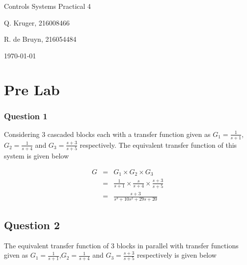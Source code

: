 \documentclass[12pt, a4paper]{article}
\begin{document}
		\begin{titlepage}
			\centering
			{\LARGE Controls Systems Practical 4 \par}
			\vspace*{1.5cm}
			{\large Q. Kruger, 216008466 \par}
			{\large R. de Bruyn, 216054484 \par}
			\vspace*{1.2cm}
			{\large \today}
			\vspace*{\fill}
			\vspace*{\fill}
		\end{titlepage}

		\tableofcontents
		\listoffigures
		\newpage

		\section{Pre Lab} %
		\label{sec:pre_lab}

		\subsubsection{Question 1} %
		\label{ssub:question_1}
		Considering 3 cascaded blocks each with a transfer function given as $G_1 = \frac{1}{s+1}$, $G_2 = \frac{1}{s+4}$ and $G_3 = \frac{s+3}{s+5}$ respectively. The equivalent transfer function of this system is given below

		\begin{equation}
			\begin{array}{rcl}
				G & = & G_1 \times G_2 \times G_3\\
				  & = & \frac{1}{s+1} \times \frac{s}{s+4} \times \frac{s+3}{s+5}\\
				  & = & \frac{s+3}{s^3+10s^2+29s+20}
			\end{array}
		\end{equation}
		

		\subsection{Question 2} %
		\label{sub:question_2}
		The equivalent transfer function of 3 blocks in parallel with transfer functions given as $G_1 = \frac{1}{s+1}$,$G_2 = \frac{1}{s+4}$ and $G_3 = \frac{s+3}{s+5}$ respectively is given below
\end{document}
